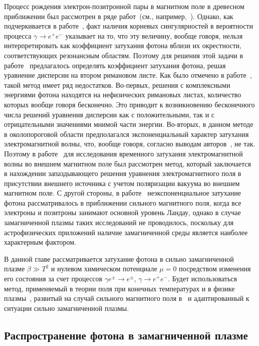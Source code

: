 Процесс рождения электрон-позитронной пары  в магнитном поле в древесном приближении был рассмотрен в ряде работ~(см., например,~\cite{Klepikov:1954,Sturrock:1971,Tademaru:1973,Daugherty:1983,Shabad:1988}). Однако, как подчеркивается в работе~\cite{Shabad:1988}, факт наличия корневых сингулярностей в вероятности процесса $\gamma\to e^+e^-$ указывает на то, что эту величину, вообще говоря, нельзя интерпретировать как коэффициент затухания фотона вблизи их окрестности, соответствующих резонансным областям. Поэтому для решения этой задачи в работе~\cite{Shabad:1988} предлагалось определять коэффициент затухания фотона, решая уравнение дисперсии на втором римановом листе.  Как было отмечено в работе~\cite{MikhChist:2001}, такой метод имеет ряд недостатков. Во-первых, решения с комплексными энергиями фотона находятся на нефизических римановых листах, количество которых вообще говоря бесконечно. Это приводит к возникновению бесконечного числа решений уравнения дисперсии как с положительными, так и с отрицательными значениями мнимой части энергии. Во-вторых, в данном методе в околопороговой области предполагался экспоненциальный характер затухания электромагнитной волны, что, вообще говоря, согласно выводам авторов~\cite{MikhChist:2001}, не так. Поэтому в работе~\cite{MikhChist:2001} для исследования временного затухания электромагнитной волны во внешнем магнитном поле был рассмотрен метод, который заключается в нахождении запаздывающего решения уравнения электромагнитного поля в присутствии внешнего источника с учетом поляризации вакуума во внешнем магнитном поле. С другой стороны, в работе~\cite{MikhChist:2001} неэкспоненциальное затухание фотона рассматривалось в приближении сильного магнитного поля, когда все электроны и позитроны занимают основной уровень Ландау, однако в случае замагниченной плазмы таких исследований не проводилось, поскольку для астрофизических приложений наличие замагниченной среды является наиболее характерным фактором.

В данной главе рассматривается затухание фотона в сильно замагниченной плазме $\beta \gg T^2$
 и нулевом химическом потенциале $\mu = 0$ посредством изменения его состояния за счет процессов $\gamma e^\pm\to e^\pm$, $\gamma \to e^+e^-$. Будет использоваться метод, применяемый в теории поля при конечных температурах и в физике плазмы~\cite{Boyan}, развитый на случай сильного магнитного поля в~\cite{MikhChist:2001} и адаптированный к ситуации сильно замагниченной плазмы.

\subsection{Распространение фотона в замагниченной плазме}

